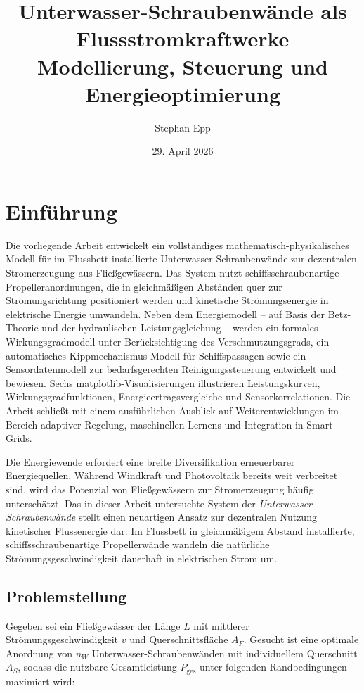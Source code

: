 ﻿\documentclass[a4paper,12pt]{article}
\title{{\bfseries Unterwasser-Schraubenwände als Flussstromkraftwerke}\\
Modellierung, Steuerung und Energieoptimierung}
\author{Stephan Epp}
\date{29. April 2026}
\theoremstyle{definition}
\begin{document}
\maketitle
\tableofcontents
\newpage

\section{Einführung}
Die vorliegende Arbeit entwickelt ein vollständiges mathematisch-physikalisches Modell für
im Flussbett installierte Unterwasser-Schraubenwände zur dezentralen Stromerzeugung aus
Fließgewässern. Das System nutzt schiffsschraubenartige Propelleranordnungen, die in
gleichmäßigen Abständen quer zur Strömungsrichtung positioniert werden und kinetische
Strömungsenergie in elektrische Energie umwandeln. Neben dem Energiemodell -- auf Basis
der Betz-Theorie und der hydraulischen Leistungsgleichung -- werden ein formales
Wirkungsgradmodell unter Berücksichtigung des Verschmutzungsgrads, ein automatisches
Kippmechanismus-Modell für Schiffspassagen sowie ein Sensordatenmodell zur
bedarfsgerechten Reinigungssteuerung entwickelt und bewiesen. Sechs matplotlib-Visualisierungen
illustrieren Leistungskurven, Wirkungsgradfunktionen, Energieertragsvergleiche
und Sensorkorrelationen. Die Arbeit schließt mit einem ausführlichen Ausblick auf
Weiterentwicklungen im Bereich adaptiver Regelung, maschinellen Lernens und Integration
in Smart Grids.

Die Energiewende erfordert eine breite Diversifikation erneuerbarer Energiequellen.
Während Windkraft und Photovoltaik bereits weit verbreitet sind, wird das Potenzial
von Fließgewässern zur Stromerzeugung häufig unterschätzt. Das in dieser Arbeit
untersuchte System der \emph{Unterwasser-Schraubenwände} stellt einen neuartigen
Ansatz zur dezentralen Nutzung kinetischer Flussenergie dar: Im Flussbett in
gleichmäßigem Abstand installierte, schiffsschraubenartige Propellerwände wandeln
die natürliche Strömungsgeschwindigkeit dauerhaft in elektrischen Strom um.

\subsection{Problemstellung}

Gegeben sei ein Fließgewässer der Länge $L$ mit mittlerer Strömungsgeschwindigkeit
$\bar{v}$ und Querschnittsfläche $A_F$. Gesucht ist eine optimale Anordnung von $n_W$
Unterwasser-Schraubenwänden mit individuellem Querschnitt $A_S$, sodass die nutzbare
Gesamtleistung $P_{\mathrm{ges}}$ unter folgenden Randbedingungen maximiert wird:
\end{document}
